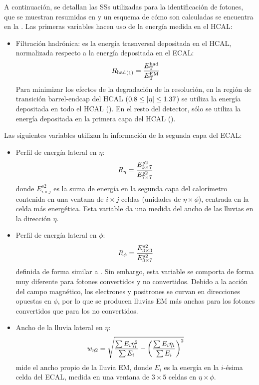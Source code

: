 A continuación, se detallan las \acp{SS} utilizadas para la identificación de fotones, que se muestran resumidas en \Tab{\ref{tab:pid_ss:ss:ss_variables}} y un esquema de c\'omo son calculadas se encuentra en la \Fig{\ref{fig:pid_ss:ss:ss_variables}}.
Las primeras variables hacen uso de la energía medida en el \ac{HCAL}:
\begin{itemize}
    \item Filtraci\'on hadr\'onica: es la energía trasnversal depositada en el \ac{HCAL}, normalizada respecto a la energía depositada en el \ac{ECAL}:
        \begin{equation}
            {\ensuremath{R_{\text{had}}}}_{(1)} = \frac{E_{\text{T}}^{\text{had}}}{E_{\text{T}}^{\text{EM}}}
        \end{equation}
        Para minimizar los efectos de la degradación de la resolución, en la región de transición barrel-endcap del \ac{HCAL} (\(0.8\leq |\eta|\leq 1.37\)) se utiliza la energía depositada en todo el \ac{HCAL} (\rhad). En el resto del detector, sólo se utiliza la energía depositada en la primera capa del \ac{HCAL} (\rhado).
\end{itemize}
Las siguientes variables utilizan la información de la segunda capa del \ac{ECAL}:
\begin{itemize}
    \item Perfil de energía lateral en \(\eta\):
        \begin{equation}
            R_{\eta} = \frac{E_{3\times7}^{s2}}{E_{7\times7}^{s2}}
        \end{equation}
        donde \(E_{i\times j}^{s2}\) es la suma de energía en la segunda capa del calorímetro contenida en una ventana de \(i \times j \) celdas (unidades de \(\eta \times \phi\)), centrada en la celda más energética. Esta variable da una medida del ancho de las lluvias en la dirección \(\eta\).
    \item Perfil de energía lateral en \(\phi\):
        \begin{equation}
            R_{\phi} = \frac{E_{3\times3}^{s2}}{E_{3\times7}^{s2}}
        \end{equation}
        definida de forma similar a \reta. Sin embargo, esta variable se comporta de forma muy diferente para fotones convertidos y no convertidos. Debido a la acción del campo magnético, los electrones y positrones se curvan en direcciones opuestas en \(\phi\), por lo que se producen lluvias \ac{EM} más anchas para los fotones convertidos que para los no convertidos.
    \item Ancho de la lluvia lateral en \(\eta\):
        \begin{equation}
            w_{\eta 2} = \sqrt{
                \frac{\sum E_i \eta_i^2}{\sum E_i}
                -
                \left(\frac{\sum E_i \eta_i}{\sum E_i}\right)^2
            }
        \end{equation}
        mide el ancho propio de la lluvia \ac{EM}, donde \(E_i\) es la energía en la \(i\)-ésima celda del \ac{ECAL}, medida en una ventana de \(3\times 5 \) celdas en \(\eta \times \phi\).
\end{itemize}
